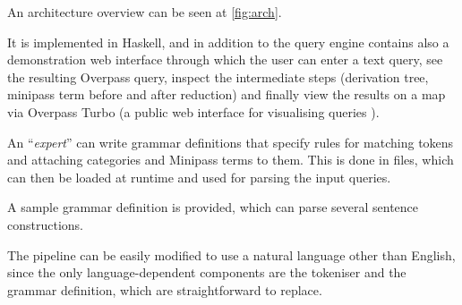 \documentclass[main.tex]{subfiles}
\begin{document}
An architecture overview can be seen at \cref{fig:arch}.

It is implemented in Haskell, and in addition to the query engine contains also
a demonstration web interface through which the user can enter a text query,
see the resulting Overpass query, inspect the intermediate steps (derivation
tree, minipass term before and after reduction) and finally view the results
on a map via Overpass Turbo (a public web interface for visualising queries
\cite{overpassturbo}).

An ``\emph{expert}'' can write grammar definitions that specify rules for matching
tokens and attaching categories and Minipass terms to them. This is done in
 files, which can then be loaded at runtime and used for parsing the
input queries.

A sample grammar definition is provided, which can parse several sentence
constructions.

The pipeline can be easily modified to use a natural language other than
English, since the only language-dependent components are the tokeniser and
the grammar definition, which are straightforward to replace.
\end{document}
